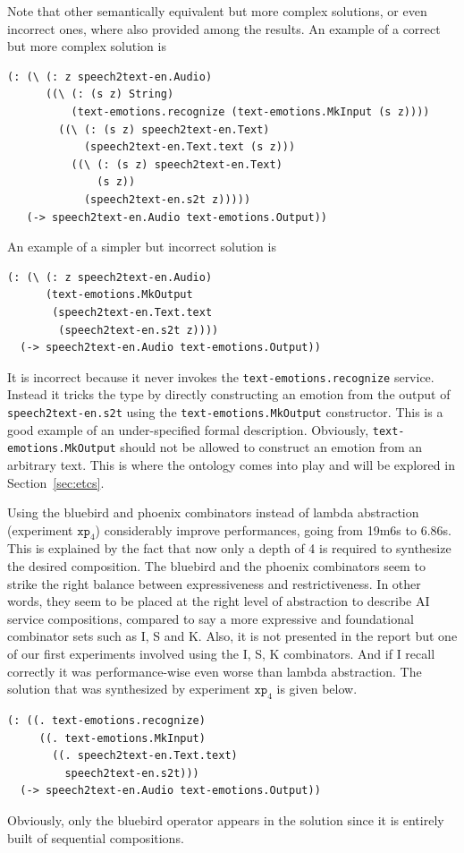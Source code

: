\documentclass[]{report}
\begin{document}
Note that other semantically equivalent but more complex solutions, or
even incorrect ones, where also provided among the results.  An
example of a correct but more complex solution is
\begin{verbatim}
(: (\ (: z speech2text-en.Audio)
      ((\ (: (s z) String)
          (text-emotions.recognize (text-emotions.MkInput (s z))))
        ((\ (: (s z) speech2text-en.Text)
            (speech2text-en.Text.text (s z)))
          ((\ (: (s z) speech2text-en.Text)
              (s z))
            (speech2text-en.s2t z)))))
   (-> speech2text-en.Audio text-emotions.Output))
\end{verbatim}
An example of a simpler but incorrect solution is
\begin{verbatim}
(: (\ (: z speech2text-en.Audio)
      (text-emotions.MkOutput
       (speech2text-en.Text.text
        (speech2text-en.s2t z))))
  (-> speech2text-en.Audio text-emotions.Output))
\end{verbatim}
It is incorrect because it never invokes the
\texttt{text-emotions.recognize} service.  Instead it
tricks the type by directly constructing an emotion from the output of
\texttt{speech2text-en.s2t} using the
\texttt{text-emotions.MkOutput} constructor.  This is a
good example of an under-specified formal description.  Obviously,
\texttt{text-emotions.MkOutput} should not be allowed to
construct an emotion from an arbitrary text.  This is where the
ontology comes into play and will be explored in
Section~\ref{sec:etcs}.

Using the bluebird and phoenix combinators instead of lambda
abstraction (experiment $\texttt{xp}_4$) considerably improve
performances, going from 19m6s to 6.86s.  This is explained by the
fact that now only a depth of 4 is required to synthesize the desired
composition.  The bluebird and the phoenix combinators seem to strike
the right balance between expressiveness and restrictiveness.  In
other words, they seem to be placed at the right level of abstraction
to describe AI service compositions, compared to say a more expressive
and foundational combinator sets such as I, S and K.  Also, it is not
presented in the report but one of our first experiments involved
using the I, S, K combinators.  And if I recall correctly it was
performance-wise even worse than lambda abstraction.  The solution
that was synthesized by experiment $\texttt{xp}_4$ is given below.
\begin{verbatim}
(: ((. text-emotions.recognize)
     ((. text-emotions.MkInput)
       ((. speech2text-en.Text.text)
         speech2text-en.s2t)))
  (-> speech2text-en.Audio text-emotions.Output))
\end{verbatim}
Obviously, only the bluebird operator appears in the solution since it
is entirely built of sequential compositions.
\end{document}
